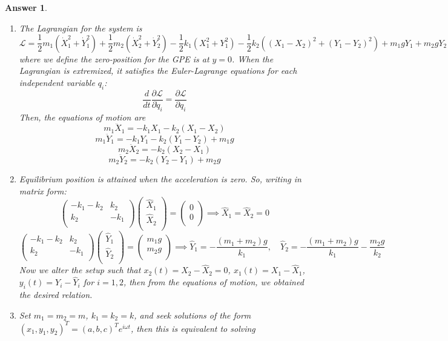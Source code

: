 \documentclass[a4paper]{article}
\newtheorem{ans}{Answer}[section]
\theoremstyle{new}
\begin{document}
\begin{ans}\leavevmode
\begin{enumerate}[label=(\alph*)]
\item The Lagrangian for the system is
$$\mathcal{L}=\frac{1}{2}m_1(\dot{X}_1^2+\dot{Y}_1^2)+\frac{1}{2}m_2(\dot{X}_2^2+\dot{Y}_2^2)-\frac{1}{2}k_1(X_1^2+Y_1^2)-\frac{1}{2}k_2((X_1-X_2)^2+(Y_1-Y_2)^2)+m_1gY_1+m_2gY_2$$
where we define the zero-position for the GPE is at $y=0$. When the Lagrangian is extremized, it satisfies the Euler-Lagrange equations for each independent variable $q_i$:
$$\frac{d}{dt}\frac{\partial\mathcal{L}}{\partial\dot{q}_i}=\frac{\partial\mathcal{L}}{\partial q_i}$$
Then, the equations of motion are
$$m_1\ddot{X}_1=-k_1X_1-k_2(X_1-X_2)$$
$$m_1\ddot{Y}_1=-k_1Y_1-k_2(Y_1-Y_2)+m_1g$$
$$m_2\ddot{X}_2=-k_2(X_2-X_1)$$
$$m_2\ddot{Y}_2=-k_2(Y_2-Y_1)+m_2g$$
\item Equilibrium position is attained when the acceleration is zero. So, writing in matrix form:
$$\begin{pmatrix}-k_1-k_2&k_2\\k_2&-k_1\\\end{pmatrix}\begin{pmatrix}\hat{X}_1\\\hat{X}_2\\\end{pmatrix}=\begin{pmatrix}0\\0\\\end{pmatrix}\implies\hat{X}_1=\hat{X}_2=0$$
$$\begin{pmatrix}-k_1-k_2&k_2\\k_2&-k_1\\\end{pmatrix}\begin{pmatrix}\hat{Y}_1\\\hat{Y}_2\\\end{pmatrix}=\begin{pmatrix}m_1g\\m_2g\\\end{pmatrix}\implies\hat{Y}_1=-\frac{(m_1+m_2)g}{k_1},\quad \hat{Y}_2=-\frac{(m_1+m_2)g}{k_1}-\frac{m_2g}{k_2}$$
Now we alter the setup such that $x_2(t)=X_2-\hat{X}_2=0$, $x_1(t)=X_1-\hat{X}_1$, $y_i(t)=Y_i-\hat{Y}_i$ for $i=1,2$, then from the equations of motion, we obtained the desired relation.
\item Set $m_1=m_2=m$, $k_1=k_2=k$, and seek solutions of the form $(x_1,y_1,y_2)^T=(a,b,c)^Te^{i\omega t}$, then this is equivalent to solving

\end{enumerate}
\end{ans}
\end{document}
